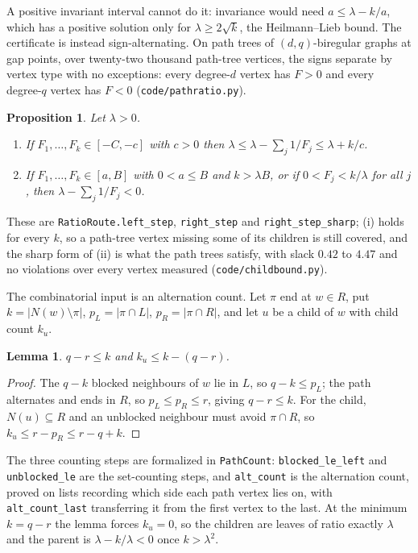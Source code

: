 \documentclass[11pt]{article}
\newtheorem{lemma}[theorem]{Lemma}
\newtheorem{proposition}[theorem]{Proposition}
\theoremstyle{remark}
\begin{document}
A positive invariant interval cannot do it: invariance would need $a\le\lambda-k/a$, which has a
positive solution only for $\lambda\ge2\sqrt k$, the Heilmann--Lieb bound. The certificate is
instead sign-alternating. On path trees of $(d,q)$-biregular graphs at gap points, over
twenty-two thousand path-tree vertices, the signs separate by vertex type with no exceptions:
every degree-$d$ vertex has $F>0$ and every degree-$q$ vertex has $F<0$ (\texttt{code/pathratio.py}).

\begin{proposition}\label{prop:ratiosteps}
Let $\lambda>0$.
\begin{enumerate}
\item[(i)] If $F_1,\dots,F_k\in[-C,-c]$ with $c>0$ then $\lambda\le\lambda-\sum_j1/F_j\le\lambda+k/c$.
\item[(ii)] If $F_1,\dots,F_k\in[a,B]$ with $0<a\le B$ and $k>\lambda B$, or if
$0<F_j<k/\lambda$ for all $j$, then $\lambda-\sum_j1/F_j<0$.
\end{enumerate}
\end{proposition}

These are \texttt{RatioRoute.left\_step}, \texttt{right\_step} and \texttt{right\_step\_sharp};
(i) holds for every $k$, so a path-tree vertex missing some of its children is still covered, and
the sharp form of (ii) is what the path trees satisfy, with slack $0.42$ to $4.47$ and no
violations over every vertex measured (\texttt{code/childbound.py}).

The combinatorial input is an alternation count. Let $\pi$ end at $w\in R$, put
$k=|N(w)\setminus\pi|$, $p_L=|\pi\cap L|$, $p_R=|\pi\cap R|$, and let $u$ be a child of $w$ with
child count $k_u$.

\begin{lemma}\label{lem:blocking}
$q-r\le k$ and $k_u\le k-(q-r)$.
\end{lemma}

\begin{proof}
The $q-k$ blocked neighbours of $w$ lie in $L$, so $q-k\le p_L$; the path alternates and ends in
$R$, so $p_L\le p_R\le r$, giving $q-r\le k$. For the child, $N(u)\subseteq R$ and an unblocked
neighbour must avoid $\pi\cap R$, so $k_u\le r-p_R\le r-q+k$.
\end{proof}

The three counting steps are formalized in \texttt{PathCount}: \texttt{blocked\_le\_left} and
\texttt{unblocked\_le} are the set-counting steps, and \texttt{alt\_count} is the alternation
count, proved on lists recording which side each path vertex lies on, with
\texttt{alt\_count\_last} transferring it from the first vertex to the last. At the minimum
$k=q-r$ the lemma forces $k_u=0$, so the children are leaves of ratio exactly $\lambda$ and the
parent is $\lambda-k/\lambda<0$ once $k>\lambda^2$.
\end{document}
